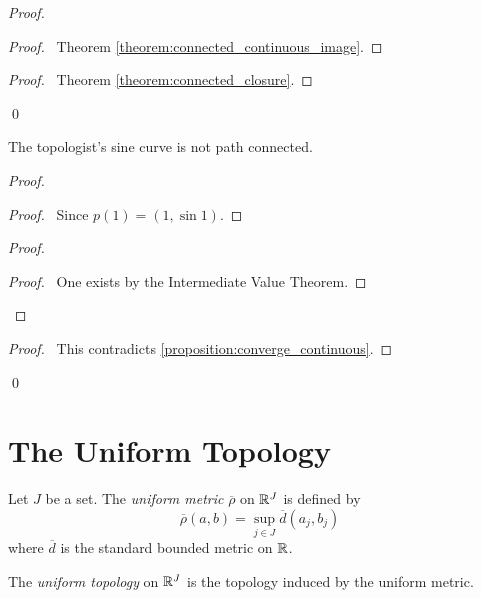 \begin{proof}
    \pf
    \begin{proof}
        \pf\ Theorem \ref{theorem:connected_continuous_image}.
    \end{proof}
    \begin{proof}
        \pf\ Theorem \ref{theorem:connected_closure}.
    \end{proof}
    \qed
\end{proof}

\begin{proposition}[CC]
    The topologist's sine curve is not path connected.
\end{proposition}

\begin{proof}
    \pf
    \begin{proof}
        \pf\ Since $p(1) = (1, \sin 1)$.
    \end{proof}
    \step{4}{\pick\ a sequence $(t_n)_{n \geq 1}$ in $(b,1]$ such that $t_n \rightarrow b$ and $\pi_2(p(t_n)) = (-1)^n$}
    \begin{proof}
        \begin{proof}
            \pf\ One exists by the Intermediate Value Theorem.
        \end{proof}
    \end{proof}
    \qedstep
    \begin{proof}
        \pf\ This contradicts \ref{proposition:converge_continuous}.
    \end{proof}
    \qed
\end{proof}

\section{The Uniform Topology}

\begin{definition}
    Let $J$ be a set. The \emph{uniform metric} $\overline{\rho}$ on $\mathbb{R}^J$ is defined by
    \[ \overline{\rho}(a,b) = \sup_{j \in J} \overline{d}(a_j, b_j) \]
    where $\overline{d}$ is the standard bounded metric on $\mathbb{R}$.

    The \emph{uniform topology} on $\mathbb{R}^J$ is the topology induced by the uniform metric.
\end{definition}

